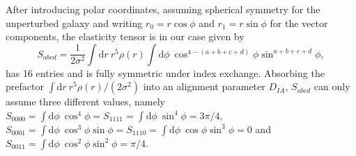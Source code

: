 \documentclass[a4paper,fleqn,usenatbib]{mnras}
\newcommand{\dd}{\mathrm{d}}
\begin{document}
After introducing polar coordinates, assuming spherical symmetry for the unperturbed galaxy and writing $r_0=r\cos\phi$ and $r_1=r\sin\phi$ for the vector components, the elasticity tensor is in our case given by
\begin{equation}
S_{abcd} = 
\frac{1}{2\sigma^2}\int\dd r\:r^5\rho(r)\int\dd\phi\:\cos^{4-(a+b+c+d)}\phi\sin^{a+b+c+d}\phi,
\end{equation}
has 16 entries and is fully symmetric under index exchange. Absorbing the prefactor $\int\dd r\:r^5\rho(r)/(2\sigma^2)$ into an alignment parameter $D_{IA}$, $S_{abcd}$ can only assume three different values, namely $S_{0000} = \int\dd\phi\:\cos^4\phi = S_{1111} = \int\dd\phi\:\sin^4\phi = 3\pi/4$, $S_{0001} = \int\dd\phi\:\cos^3\phi\sin\phi = S_{1110} = \int\dd\phi\:\cos\phi\sin^3\phi = 0$ and $S_{0011} = \int\dd\phi\:\cos^2\phi\sin^2\phi = \pi/4$.
\end{document}
